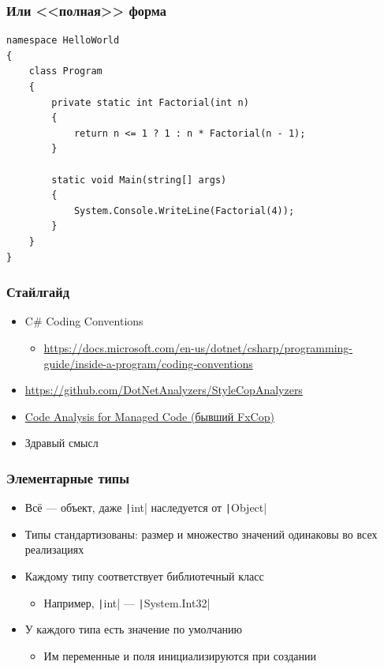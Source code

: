 \documentclass{../../slides-style}
\begin{document}
    \begin{frame}[fragile]
        \frametitle{Или <<полная>> форма}
        \begin{verbatim}
namespace HelloWorld
{
    class Program
    {
        private static int Factorial(int n) 
        {
            return n <= 1 ? 1 : n * Factorial(n - 1);
        }

        static void Main(string[] args)
        {
            System.Console.WriteLine(Factorial(4));
        }
    }
}
        \end{verbatim}
    \end{frame}

    \begin{frame}
        \frametitle{Стайлгайд}
        \begin{itemize}
            \item C\# Coding Conventions
            \begin{itemize}
                \item \url{https://docs.microsoft.com/en-us/dotnet/csharp/programming-guide/inside-a-program/coding-conventions}
            \end{itemize}
            \item \url{https://github.com/DotNetAnalyzers/StyleCopAnalyzers}
            \item \href{https://msdn.microsoft.com/en-us/library/3z0aeatx.aspx}{Code Analysis for Managed Code (бывший FxCop)}
            \item Здравый смысл
        \end{itemize}
    \end{frame}

    \begin{frame}
        \frametitle{Элементарные типы}
        \begin{itemize}
            \item Всё --- объект, даже \texttt|int| наследуется от \texttt|Object|
            \item Типы стандартизованы: размер и множество значений одинаковы во всех реализациях
            \item Каждому типу соответствует библиотечный класс
            \begin{itemize}
                \item Например, \texttt|int| --- \texttt|System.Int32|
            \end{itemize}
            \item У каждого типа есть значение по умолчанию
            \begin{itemize}
                \item Им переменные и поля инициализируются при создании
            \end{itemize}
        \end{itemize}
    \end{frame}
\end{document}
